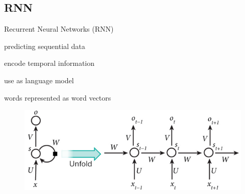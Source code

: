 \documentclass[16pt]{beamer}
\newenvironment{wideitemize}{\itemize\addtolength{\itemsep}{10pt}}{\enditemize}
\begin{document}
\subsection{RNN}%
\begin{frame}{Recurrent Neural Networks (RNN)}
\begin{wideitemize}
\item predicting sequential data
\item encode temporal information
\item use as language model
\item words represented as word vectors
\begin{figure}[tb]
           \centering
           \includegraphics[width=\linewidth]{rnn.PNG}
\\\cite{LeCun2015}
\end{figure}

\end{wideitemize}
\end{frame}
\end{document}
